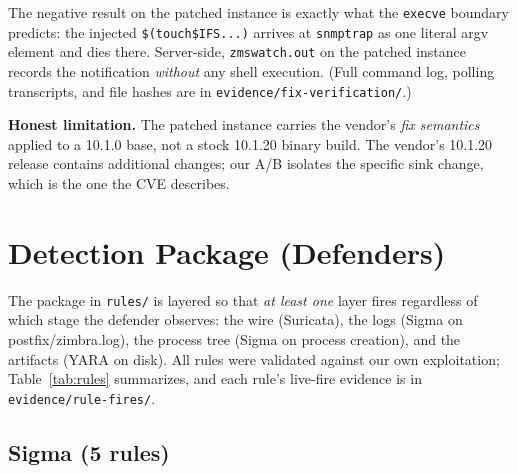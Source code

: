 \documentclass[journal]{IEEEtran}
\begin{document}
The negative result on the patched instance is exactly what the
\texttt{execve} boundary predicts: the injected
\texttt{\$(touch\${IFS}...)} arrives at \texttt{snmptrap} as one literal
argv element and dies there. Server-side, \texttt{zmswatch.out} on the
patched instance records the notification \emph{without} any shell
execution. (Full command log, polling transcripts, and file hashes are in
\texttt{evidence/fix-verification/}.)

\textbf{Honest limitation.} The patched instance carries the vendor's
\emph{fix semantics} applied to a 10.1.0 base, not a stock 10.1.20 binary
build. The vendor's 10.1.20 release contains additional changes; our A/B
isolates the specific sink change, which is the one the CVE describes.

\section{Detection Package (Defenders)}
\label{sec:detection}

The package in \texttt{rules/} is layered so that \emph{at least one} layer
fires regardless of which stage the defender observes: the wire (Suricata),
the logs (Sigma on postfix/zimbra.log), the process tree (Sigma on
process creation), and the artifacts (YARA on disk). All rules were
validated against our own exploitation; Table~\ref{tab:rules} summarizes,
and each rule's live-fire evidence is in \texttt{evidence/rule-fires/}.

\subsection{Sigma (5 rules)}
\end{document}
